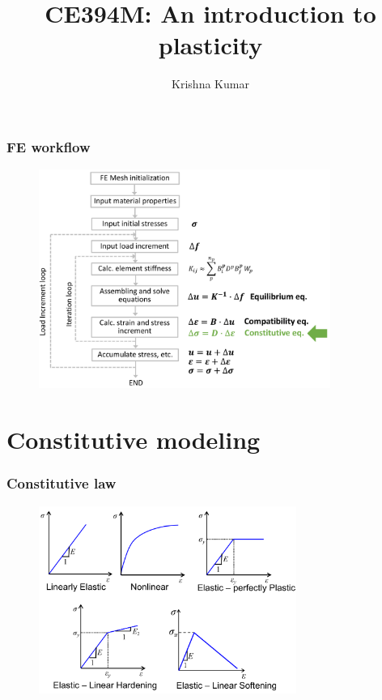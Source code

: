 \documentclass[notes]{beamer}
\title[CE394M: intro to plasticity]{CE394M: An introduction to plasticity}
\author{Krishna Kumar} %
\institute[UT Austin] %
{
University of Texas at Austin \\
\medskip
\textit{
  \url{krishnak@utexas.edu}} %
}
\date{} %
\begin{document}
\begin{frame}
\titlepage %
\end{frame}


\begin{frame}
	\frametitle{FE workflow}
	\begin{figure}
		\includegraphics[width=0.85\textwidth]{figs/fe-code.png}
		
	\end{figure}
\end{frame}
\section{Constitutive modeling}
\begin{frame}
\frametitle{Constitutive law}
\begin{figure}
	\includegraphics[width=0.75\textwidth]{figs/constitutive-law.png}
\end{figure}
\end{frame}
\end{document}

